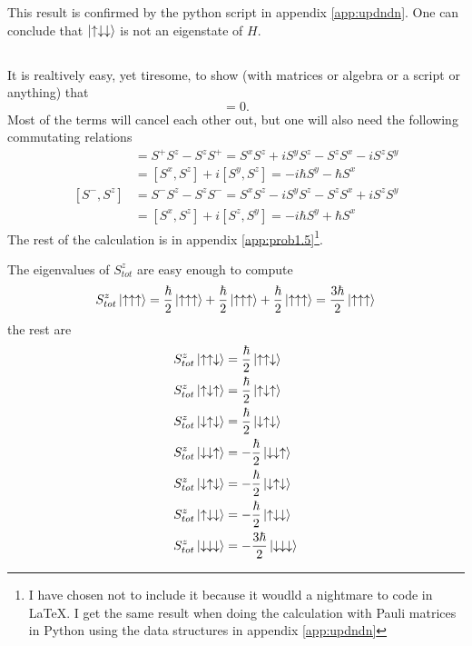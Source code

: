 \documentclass{article}
\begin{document}
This result is confirmed by the python script in appendix \ref{app:updndn}. One can conclude that $\ket{\uparrow\downarrow\downarrow}$ is not an eigenstate of $H$.

\subsection{}
It is realtively easy, yet tiresome, to show (with matrices or algebra or a script or anything) that
\begin{equation}
[H,S^z_{tot}]=0.
\end{equation}
Most of the terms will cancel each other out, but one will also need the following commutating relations
\begin{align*}
[S^+,S^z]&=S^+S^z-S^zS^+ = S^xS^z+iS^yS^z-S^zS^x-iS^zS^y \\
&= [S^x,S^z] + i[S^y, S^z] = -i\hbar S^y-\hbar S^x\\
[S^-,S^z]&=S^-S^z-S^zS^- = S^xS^z-iS^yS^z-S^zS^x+iS^zS^y \\
&= [S^x,S^z] + i[S^z, S^y] = -i\hbar S^y+\hbar S^x
\end{align*}
The rest of the calculation is in appendix \ref{app:prob1.5}\footnote{I have chosen not to include it because it woudld a nightmare to code in \LaTeX. I get the same result when doing the calculation with Pauli matrices in Python using the data structures in appendix \ref{app:updndn}}.

The eigenvalues of $S^z_{tot}$ are easy enough to compute
\begin{equation*}
S^z_{tot}\ket{\uparrow\uparrow\uparrow}=\frac{\hbar}{2}\ket{\uparrow\uparrow\uparrow}+\frac{\hbar}{2}\ket{\uparrow\uparrow\uparrow} + \frac{\hbar}{2}\ket{\uparrow\uparrow\uparrow} = \frac{3\hbar}{2}\ket{\uparrow\uparrow\uparrow}
\end{equation*}
the rest are
\begin{align*}
S^z_{tot}\ket{\uparrow\uparrow\downarrow}&=\frac{\hbar}{2}\ket{\uparrow\uparrow\downarrow} \\
S^z_{tot}\ket{\uparrow\downarrow\uparrow}&=\frac{\hbar}{2}\ket{\uparrow\downarrow\uparrow} \\
S^z_{tot}\ket{\downarrow\uparrow\downarrow}&=\frac{\hbar}{2}\ket{\downarrow\uparrow\downarrow} \\
S^z_{tot}\ket{\downarrow\downarrow\uparrow}&=-\frac{\hbar}{2}\ket{\downarrow\downarrow\uparrow} \\
S^z_{tot}\ket{\downarrow\uparrow\downarrow}&=-\frac{\hbar}{2}\ket{\downarrow\uparrow\downarrow} \\
S^z_{tot}\ket{\uparrow\downarrow\downarrow}&=-\frac{\hbar}{2}\ket{\uparrow\downarrow\downarrow} \\
S^z_{tot}\ket{\downarrow\downarrow\downarrow}&=-\frac{3\hbar}{2}\ket{\downarrow\downarrow\downarrow} 
\end{align*}
\end{document}
